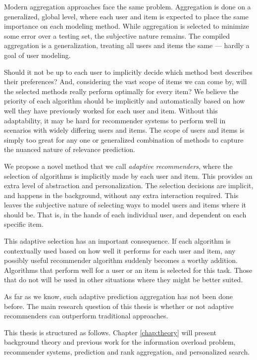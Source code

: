 Modern aggregation approaches face the same problem. 
Aggregation is done on a generalized, global level,
where each user and item is expected to place the same importance on each modeling method.
While aggregation is selected to minimize some error over a testing set,
the subjective nature remains. The compiled aggregation is a generalization,
treating all users and items the same --- hardly a goal of user modeling.

Should it not be up to each user to implicitly decide which method best describes their preferences?
And, considering the vast scope of items we can come by, will the selected
methods really perform optimally for every item?
We believe the priority of each algorithm should be implicitly and automatically
based on how well they have previously worked for each user and item.
Without this adaptability, it may be hard for recommender systems
to perform well in scenarios with widely differing users and items.
The scope of users and items is simply too great for any one or generalized combination
of methods to capture the nuanced nature of relevance prediction.

We propose a novel method that we call \emph{adaptive recommenders}, 
where the selection of algorithms is implicitly made by each user and item.
This provides an extra level of abstraction and personalization.
The selection decisions are implicit, and happens in the background, without any extra interaction required.
This leaves the subjective nature of selecting ways to model users and items where it should be.
That is, in the hands of each individual user, and dependent on each specific item.

This adaptive selection has an important consequence. 
If each algorithm is contextually used based on how well it performs for each user and item,
any possibly useful recommender algorithm suddenly becomes a worthy addition.
Algorithms that perform well for a user or an item is selected for this task.
Those that do not will be used in other situations where they might be better suited.

As far as we know, such adaptive prediction aggregation has not been done before.
The main research question of this thesis is whether or not adaptive recommenders
can outperform traditional approaches.

\hr

\noindent
This thesis is structured as follows.
Chapter \ref{chap:theory} will present background theory and previous work for
the information overload problem, recommender systems, 
prediction and rank aggregation, and personalized search. 

